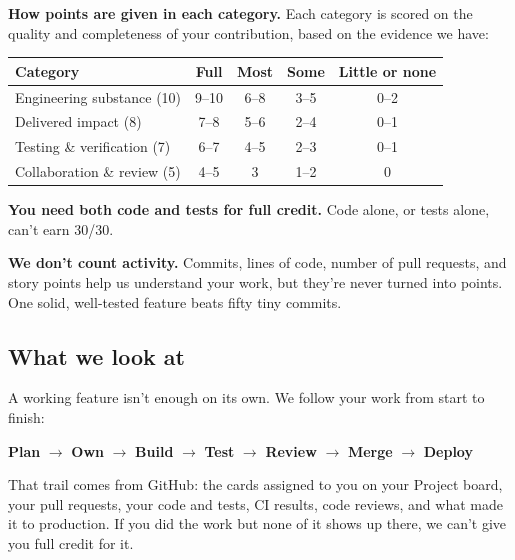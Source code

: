 \documentclass[11pt]{article}
\begin{document}
\textbf{How points are given in each category.} Each category is scored on the quality and completeness of your contribution, based on the evidence we have:
\begin{center}
\renewcommand{\arraystretch}{1.2}
\begin{tabular}{l c c c c}
\toprule
\textbf{Category} & \textbf{Full} & \textbf{Most} & \textbf{Some} & \textbf{Little or none} \\
\midrule
Engineering substance (10) & 9--10 & 6--8 & 3--5 & 0--2 \\
Delivered impact (8) & 7--8 & 5--6 & 2--4 & 0--1 \\
Testing \& verification (7) & 6--7 & 4--5 & 2--3 & 0--1 \\
Collaboration \& review (5) & 4--5 & 3 & 1--2 & 0 \\
\bottomrule
\end{tabular}
\end{center}

\textbf{You need both code and tests for full credit.} Code alone, or tests alone, can't earn 30/30.

\textbf{We don't count activity.} Commits, lines of code, number of pull requests, and story points help us understand your work, but they're never turned into points. One solid, well-tested feature beats fifty tiny commits.

\subsection*{What we look at}
A working feature isn't enough on its own. We follow your work from start to finish:
\begin{center}
\textbf{Plan} $\rightarrow$ \textbf{Own} $\rightarrow$ \textbf{Build} $\rightarrow$ \textbf{Test} $\rightarrow$ \textbf{Review} $\rightarrow$ \textbf{Merge} $\rightarrow$ \textbf{Deploy}
\end{center}
That trail comes from GitHub: the cards assigned to you on your Project board, your pull requests, your code and tests, CI results, code reviews, and what made it to production. If you did the work but none of it shows up there, we can't give you full credit for it.
\end{document}
